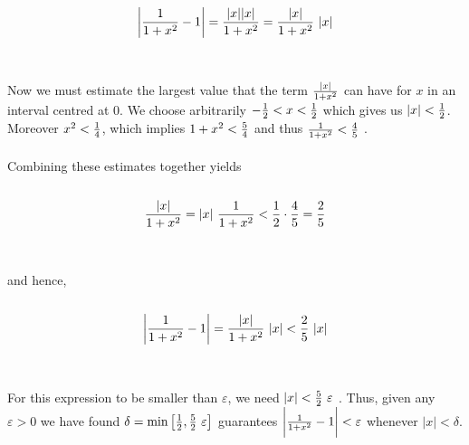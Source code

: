 \documentclass[12pt]{amsart}
\begin{document}
\begin{enumerate}
		$$\bigg|{1 \over 1+ x^2} - 1\bigg| =  {|x||x| \over 1+ x^2} =  {|x| \over 1+ x^2} \text{ }|x|$$\\
		\\
		Now we must estimate the largest value that the term ${|x| \over 1+ x^2}$ can have for $x$ in an 
		interval centred at 0.  We choose arbitrarily $-{1\over2} < x < {1\over2}$ which gives us
		$|x| < {1\over2}$. Moreover $x^2 < {1 \over 4}$, which implies $1+x^2<{5\over4}$ and thus 
		${1\over1+x^2}<{4\over5}$ .\\
		\\  
		Combining these estimates together yields\\
		\\
		$${|x| \over 1+ x^2} = |x| \text{ }{1\over1+x^2} < {1\over2} \cdot {4\over 5} = {2\over 5}$$\\
		\\
		and hence,\\
		\\
		$$\bigg|{1 \over 1+ x^2} - 1\bigg| = {|x| \over 1+ x^2} \text{ }|x| < {2\over 5}\text{ }|x|$$\\
		\\
		For this expression to be smaller than $\varepsilon$, we need $|x| < {5\over2}\text{ }\varepsilon$ .  
		Thus, given any $\varepsilon > 0$ we have found 
		$\delta = \text{min}\left[{1\over2} , {5\over2}\text{ }\varepsilon\right]$ guarantees
		$\bigg|{1 \over 1+ x^2} - 1\bigg| < \varepsilon$ whenever $|x| < \delta$.\\
		
\end{enumerate}	
	
\end{document}
